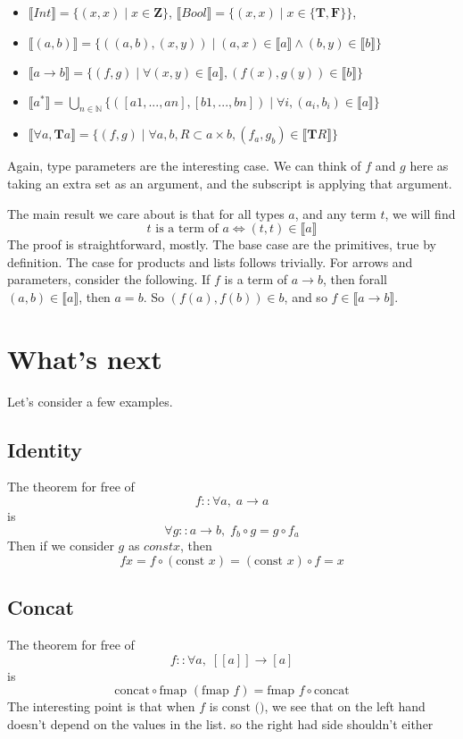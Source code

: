 \documentclass[12pt]{article}
\newcommand{\llb}{\llbracket}
\newcommand{\rrb}{\rrbracket}
\begin{document}
\begin{itemize}
\item $ \llb Int \rrb  = \{(x,x) \;|\; x \in \mathbf{Z}\}$, $ \llb Bool \rrb  = \{(x,x) \;|\; x \in \{\mathbf{T, F}\}\}$, 
\item $ \llb (a,b) \rrb  = \{ ((a,b), (x,y)) \;|\; (a,x) \in \llb a \rrb \land (b,y) \in \llb b \rrb \}$ 
\item $ \llb a \rightarrow b \rrb  = \{ (f,g) \; | \; 
    \forall (x,y) \in \llb a \rrb, (f(x), g(y)) \in  \llb b \rrb \}$ 
\item $ \llb a ^ * \rrb  =  \bigcup_{n \in \mathbb{N}} \{([a1,...,an],[b1,...,bn]) \;|\; \forall i, (a_i, b_i) \in \llb a \rrb \}$
\item $ \llb \forall a, \mathbf{T} a \rrb = \{(f,g) \; | \;
    \forall a,b, R \subset a \times b, 
      (f_a, g_{b}) \in  \llb \mathbf{T} R \rrb \} $
\end{itemize}
Again, type parameters are the interesting case.
We can think of $f$ and $g$ here as taking an extra set as an argument,
and the subscript is applying that argument.

The main result we care about is that for all types $a$, and any term $t$, we will find 
\[
t \text{ is a term of } a \iff (t,t) \in \llb a \rrb
\]
The proof is straightforward, mostly.
The base case are the primitives, true by definition.
The case for products and lists follows trivially. 
For arrows and parameters, consider the following. If $f$ is a term of $a \rightarrow b$, then forall $(a,b) \in \llb a \rrb$, then $a = b$. So $(f(a), f(b)) \in b$, and so $f \in \llb a \rightarrow b \rrb$. 


\section{What's next}
Let's consider a few examples.
\subsection{Identity}
The theorem for free of 
\[
  f :: \forall a,\; a \rightarrow a
\]
\noindent is
\[
  \forall g :: a \rightarrow b, \; f_b \circ g = g \circ f_a
\]
Then if we consider $g$ as $const x$, then 
\[
  f x = f \circ (\text{const } x) = (\text{const } x) \circ f = x
\]
\subsection{Concat}
The theorem for free of 
\[
  f :: \forall a,\; [[a]] \rightarrow [a]
\]
\noindent is
\[
  \text{concat} \circ \text{fmap } (\text{fmap } f) = 
  \text{fmap } f \circ \text{concat}
\]
The interesting point is that when $f$ is $\text{const ()}$, we see that on the left hand doesn't depend on the values in the list.
so the right had side shouldn't either
\end{document}
